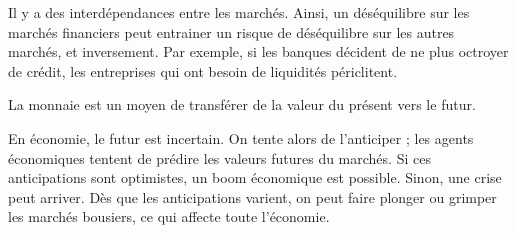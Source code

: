 Il y a des interdépendances entre les marchés. Ainsi, un déséquilibre sur les marchés financiers peut entrainer un risque de déséquilibre sur les autres marchés, et inversement. Par exemple, si les banques décident de ne plus octroyer de crédit, les entreprises qui ont besoin de liquidités périclitent.

La monnaie est un moyen de transférer de la valeur du présent vers le futur.

En économie, le futur est incertain. On tente alors de l'anticiper ; les agents économiques tentent de prédire les valeurs futures du marchés. Si ces anticipations sont optimistes, un boom économique est possible. Sinon, une crise peut arriver. Dès que les anticipations varient, on peut faire plonger ou grimper les marchés bousiers, ce qui affecte toute l'économie.